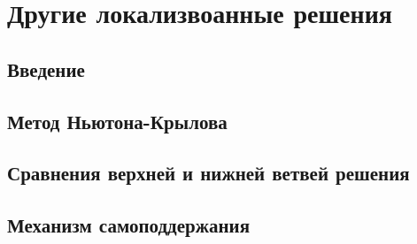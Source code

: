 
\chapter{Другие локализвоанные решения}

\section{Введение}
\section{Метод Ньютона-Крылова}
\section{Сравнения верхней и нижней ветвей решения}
\section{Механизм самоподдержания}


